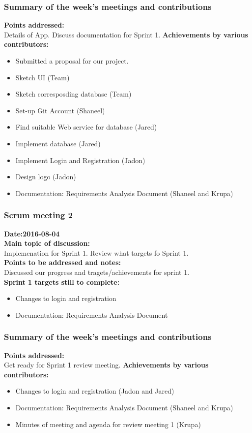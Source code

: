 \documentclass[12pt]{article}
\begin{document}
{\subsubsection{Summary of the week's meetings and contributions}
\textbf{Points addressed:} \\
Details of App. Discuss documentation for Sprint 1.
\textbf{Achievements by various contributors:}
\begin{itemize}
\item Submitted a proposal for our project.
\item Sketch UI (Team)
\item Sketch corresposding database (Team)
\item Set-up Git Account (Shaneel)
\item Find suitable Web service for database (Jared)
\item Implement database (Jared)
\item Implement Login and Registration (Jadon)
\item Design logo (Jadon)
\item Documentation: Requirements Analysis Document (Shaneel and Krupa)
\end{itemize}
\subsubsection{Scrum meeting 2}
\textbf{Date:2016-08-04}\\
\textbf{Main topic of discussion:}\\
Implemenation for Sprint 1. Review what targets fo Sprint 1.\\
\textbf{Points to be addressed and notes:}\\
Discussed our progress and tragets/achievements for sprint 1.\\
\textbf{Sprint 1 targets still to complete:} \\
\begin{itemize}
\item Changes to login and registration
\item Documentation: Requirements Analysis Document
\end{itemize}
\subsubsection{Summary of the week's meetings and contributions}
\textbf{Points addressed:} \\
Get ready for Sprint 1 review meeting.
\textbf{Achievements by various contributors:}
\begin{itemize}
\item Changes to login and registration (Jadon and Jared)
\item Documentation: Requirements Analysis Document (Shaneel and Krupa)
\item Minutes of meeting and agenda for review meeting 1 (Krupa)
\end{itemize}

}
\end{document}
